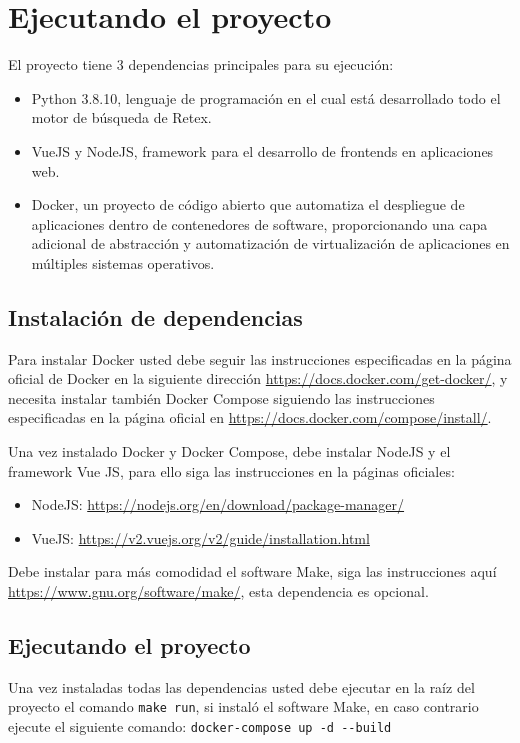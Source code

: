 \section{Ejecutando el proyecto}

El proyecto tiene 3 dependencias principales para su ejecución:

\begin{itemize}
    \item Python 3.8.10, lenguaje de programación en el cual está desarrollado todo el motor de búsqueda de Retex. 
    \item VueJS y NodeJS, framework para el desarrollo de frontends en aplicaciones web.
    \item Docker, un proyecto de código abierto que automatiza el despliegue de aplicaciones dentro de contenedores de software, proporcionando una capa adicional de abstracción y automatización de virtualización de aplicaciones en múltiples sistemas operativos.
\end{itemize}

\subsection{Instalación de dependencias}

Para instalar Docker usted debe seguir las instrucciones especificadas en la página oficial de Docker en la siguiente dirección \url{https://docs.docker.com/get-docker/}, y necesita instalar también Docker Compose siguiendo las instrucciones especificadas en la página oficial en \url{https://docs.docker.com/compose/install/}.

Una vez instalado Docker y Docker Compose, debe instalar NodeJS y el framework Vue JS, para ello siga las instrucciones en la páginas oficiales:

\begin{itemize}
    \item NodeJS: \url{https://nodejs.org/en/download/package-manager/}
    \item VueJS: \url{https://v2.vuejs.org/v2/guide/installation.html}
\end{itemize}

Debe instalar para más comodidad el software Make, siga las instrucciones aquí \url{https://www.gnu.org/software/make/}, esta dependencia es opcional.

\subsection{Ejecutando el proyecto}

Una vez instaladas todas las dependencias usted debe ejecutar en la raíz del proyecto el comando \verb|make run|, si instaló el software Make, en caso contrario ejecute el siguiente comando: \verb|docker-compose up -d --build|